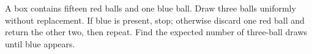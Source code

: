 A box contains fifteen red balls and one blue ball. Draw three balls uniformly without replacement. If blue is present, stop; otherwise discard one red ball and return the other two, then repeat. Find the expected number of three-ball draws until blue appears.
